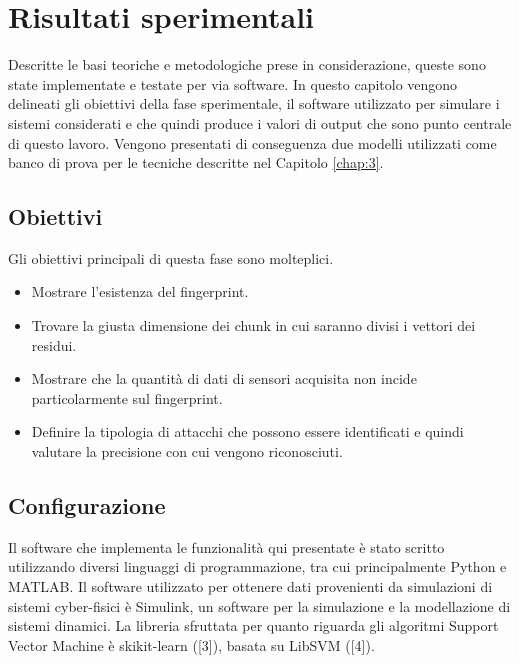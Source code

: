 \documentclass[Lau,binding=0.6cm]{sapthesis}
\begin{document}

\chapter{Risultati sperimentali}\label{chap:5}
Descritte le basi teoriche e metodologiche prese in considerazione, queste sono state implementate e testate per via software.
In questo capitolo vengono delineati gli obiettivi della fase sperimentale, il software utilizzato per simulare i sistemi considerati e che quindi produce i valori di output 
che sono punto centrale di questo lavoro. Vengono presentati di conseguenza due modelli utilizzati come banco di prova per le tecniche descritte nel Capitolo \ref{chap:3}.

\section{Obiettivi}\label{sec:1}
Gli obiettivi principali di questa fase sono molteplici.
\begin{itemize}
    \item Mostrare l'esistenza del fingerprint.
    \item Trovare la giusta dimensione dei chunk in cui saranno divisi i vettori dei residui.
    \item Mostrare che la quantit\`a di dati di sensori acquisita non incide particolarmente sul fingerprint.
    \item Definire la tipologia di attacchi che possono essere identificati e quindi valutare la precisione con cui vengono riconosciuti.
 \end{itemize}

\section{Configurazione}
Il software che implementa le funzionalit\`a qui presentate \`e stato scritto utilizzando diversi linguaggi di programmazione, tra cui principalmente Python e MATLAB.
Il software utilizzato per ottenere dati provenienti da simulazioni di sistemi cyber-fisici \`e Simulink, un software per la simulazione e la modellazione di sistemi dinamici.
La libreria sfruttata per quanto riguarda gli algoritmi Support Vector Machine \`e skikit-learn ([3]), basata su LibSVM ([4]).
\end{document}
